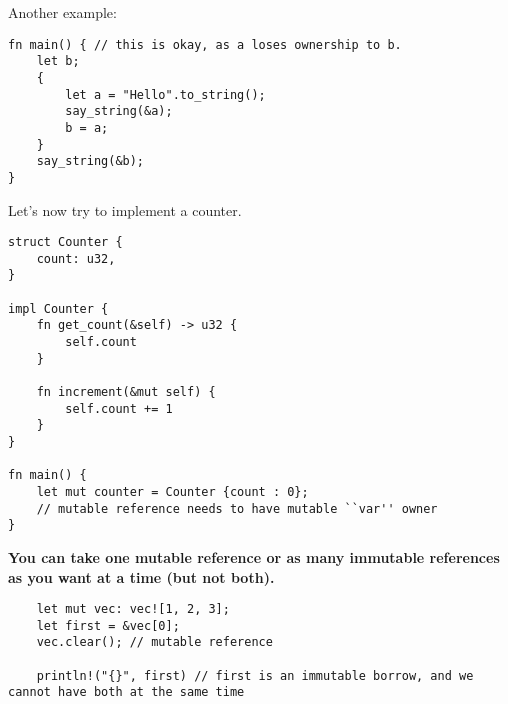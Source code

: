 \documentclass[12pt]{amsart}
\begin{document}
Another example:
\begin{lstlisting}
fn main() { // this is okay, as a loses ownership to b.
    let b;
    {
        let a = "Hello".to_string();
        say_string(&a);
        b = a;
    }
    say_string(&b);
}
\end{lstlisting}

Let's now try to implement a counter.

\begin{lstlisting}
struct Counter {
    count: u32,
}

impl Counter {
    fn get_count(&self) -> u32 {
        self.count
    }

    fn increment(&mut self) {
        self.count += 1
    }
}

fn main() {
    let mut counter = Counter {count : 0}; 
    // mutable reference needs to have mutable ``var'' owner
}
\end{lstlisting}

\textbf{You can take one mutable reference or as many immutable references as you want at a time (but not both).}

\begin{lstlisting}
    let mut vec: vec![1, 2, 3];
    let first = &vec[0];
    vec.clear(); // mutable reference

    println!("{}", first) // first is an immutable borrow, and we cannot have both at the same time
\end{lstlisting}
\end{document}
